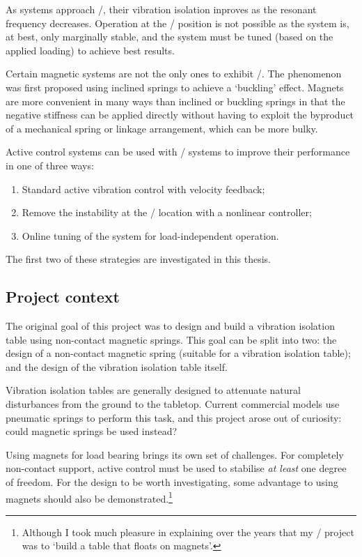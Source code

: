 As systems approach \qzs/, their vibration isolation inproves as the resonant
frequency decreases. Operation at the \qzs/ position is not possible as the
system is, at best, only marginally stable, and the system must be tuned
(based on the applied loading) to achieve best results.

Certain magnetic systems are not the only ones to exhibit \qzs/. The phenomenon
was first proposed using inclined springs to achieve a `buckling' effect.
Magnets are more convenient in many ways than inclined or buckling springs in
that the negative stiffness can be applied directly without having to exploit
the byproduct of a mechanical spring or linkage arrangement, which can be more
bulky.

Active control systems can be used with \qzs/ systems to improve their 
performance in one of three ways:
\begin{enumerate}
  \item Standard active vibration control with velocity feedback;
  \item Remove the instability at the \qzs/ location with a nonlinear controller;
  \item Online tuning of the system for load-independent operation.
\end{enumerate}
The first two of these strategies are investigated in this thesis.

\subsection{Project context}

The original goal of this project was to design and build a vibration
isolation table using non-contact magnetic springs. This goal can be
split into two: the design of a non-contact magnetic spring (suitable
for a vibration isolation table); and the design of the vibration
isolation table itself.

Vibration isolation tables are generally designed to attenuate natural
disturbances from the ground to the tabletop. Current commercial models use
pneumatic springs to perform this task, and this project arose out of
curiosity: could magnetic springs be used instead?

Using magnets for load bearing brings its own set of challenges. For
completely non-contact support, active control must be used to
stabilise \emph{at least} one degree of freedom. For the design to be
worth investigating, some advantage to using magnets should also be
demonstrated.\footnote{Although I took much pleasure in explaining
  over the years that my \PhD/ project was to `build a table that
  floats on magnets'.}

